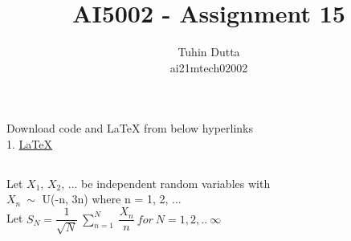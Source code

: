 \documentclass[journal,12pt,twocolumn]{IEEEtran}
\begin{document}
\providecommand{\mtx}[1]{\mathbf{#1}}
\providecommand{\fourier}{\overset{\mathcal{F}}{ \rightleftharpoons}}
\providecommand{\system}{\overset{\mathcal{H}}{ \longleftrightarrow}}
\newcommand{\solution}{\noindent \textbf{Solution: }}
\newcommand{\cosec}{\,\text{cosec}\,}
\providecommand{\dec}[2]{\ensuremath{\overset{#1}{\underset{#2}{\gtrless}}}}
\newcommand{\myvec}[1]{\ensuremath{\begin{pmatrix}#1\end{pmatrix}}}
\newcommand{\mydet}[1]{\ensuremath{\begin{vmatrix}#1\end{vmatrix}}}
\makeatletter
{}
\makeatother
\let\StandardTheFigure\thefigure
\let\vec\mathbf
\renewcommand{\thefigure}{\theproblem}
\def\putbox#1#2#3{\makebox[0in][l]{\makebox[#1][l]{}\raisebox{\baselineskip}[0in][0in]{\raisebox{#2}[0in][0in]{#3}}}}
     \def\rightbox#1{\makebox[0in][r]{#1}}
     \def\centbox#1{\makebox[0in]{#1}}
     \def\topbox#1{\raisebox{-\baselineskip}[0in][0in]{#1}}
     \def\midbox#1{\raisebox{-0.5\baselineskip}[0in][0in]{#1}}
\vspace{3cm}
\title{AI5002 - Assignment 15}
\author{Tuhin Dutta\\ ai21mtech02002}
\maketitle
\newpage
\bigskip
\renewcommand{\thefigure}{\theenumi}
\renewcommand{\thetable}{\theenumi}
\begin{mdframed}
Download code and LaTeX from below hyperlinks\\
1. \href{https://github.com/Tauhait/AI5002/tree/main/Assignment-15/LaTeX}{LaTeX}
\end{mdframed}
\subsection*{}
Let $X_1$, $X_2$, ... be independent random variables with\\ $X_n\ \sim$ U(-n, 3n) where n = 1, 2, ...\\

Let $S_N = \dfrac{1}{\sqrt{N}}\ \sum_{n=1}^{N}\ \dfrac{X_n}{n}\ for\ N = 1, 2, ..\ \infty$\\
\end{document}
